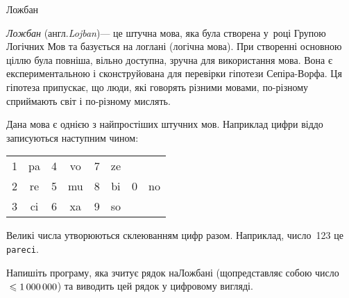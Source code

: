 \begin{problemAllDefault}{Ложбан}

\emph{Ложбан} (англ.\nolinebreak[3] \emph{Lojban})\nolinebreak[3] --- це штучна мова, яка була створена у~році Групою Логічних Мов та базується на логлані (логічна мова). При створенні основною ціллю була повніша, вільно доступна, зручна для використання мова. Вона є експериментальною і сконструйована для перевірки гіпотези Сепіра-Ворфа. Ця гіпотеза припускає, що люди, які говорять різними мовами, по-різному сприймають світ і по-різному мислять.

Дана мова є однією з найпростіших штучних мов. Наприклад цифри від\nolinebreak[1] до записуються наступним чином:

\vspace{-0.25\baselineskip plus 6pt minus 6pt}

\begin{center}
\begin{ttfamily}
\begin{tabular}{cc@{ ~ ~ ~ }cc@{ ~ ~ ~ }cc@{ ~ ~ ~ }cc}
1 & pa	&	4 & vo	&	7 & ze				\\
2 & re	&	5 & mu	&	8 & bi	&	0 & no	\\
3 & ci	&	6 & xa	&	9 & so				
\end{tabular}
\end{ttfamily}

\end{center}

\vspace{-0.25\baselineskip plus 6pt minus 6pt}

Великі числа утворюються склеюванням цифр разом. Наприклад, число~123 це \texttt{pareci}.

\Task	\hspace{0pt minus 0.5em}Напишіть програму, яка зчитує рядок на\nolinebreak[2] Ложбані (що\nolinebreak[3] представляє собою число${}\leqslant1\,000\,000$) та виводить цей рядок у цифровому вигляді.

\Example
\begin{exampleSimple}{5em}{3em}%
%
\end{exampleSimple}

\end{problemAllDefault}
